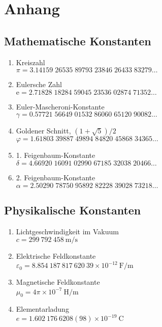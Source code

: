 \documentclass[a4paper,10pt,fleqn,twocolumn,twoside,openany]{book}
\numberwithin{equation}{chapter}
\newcommand{\unit}[1]{\mathrm{#1}}
\newcommand{\ee}{\mathrm e}
\begin{document}
\chapter{Anhang}
\section{Mathematische Konstanten}
\begin{enumerate}
\item Kreiszahl\\
$\pi = 3.14159\;26535\;89793\;23846\;26433\;83279\ldots$

\item Eulersche Zahl\\
$\ee = 2.71828\;18284\;59045\;23536\;02874\;71352\ldots$

\item Euler-Mascheroni-Konstante\\
$\gamma = 0.57721\;56649\;01532\;86060\;65120\;90082\ldots$

\item Goldener Schnitt, $(1+\sqrt{5})/2$\\
$\varphi = 1.61803\;39887\;49894\;84820\;45868\;34365\ldots$

\item 1. Feigenbaum-Konstante\\
$\delta = 4.66920\;16091\;02990\;67185\;32038\;20466\ldots$

\item 2. Feigenbaum-Konstante\\
$\alpha = 2.50290\;78750\;95892\;82228\;39028\;73218\ldots$
\end{enumerate}

\section{Physikalische Konstanten}

\begin{enumerate}
\item Lichtgeschwindigkeit im Vakuum\\
$c=299\:792\:458\:\unit{m/s}$

\item Elektrische Feldkonstante\\
$\varepsilon_0 = 8.854\:187\:817\:620\:39\times 10^{-12}\:\unit{F/m}$

\item Magnetische Feldkonstante\\
$\mu_0 = 4\pi\times 10^{-7}\:\unit{H/m}$

\item Elementarladung\\
$e = 1.602\:176\:6208(98)\times 10^{-19}\:\unit{C}$
\end{enumerate}
\end{document}
